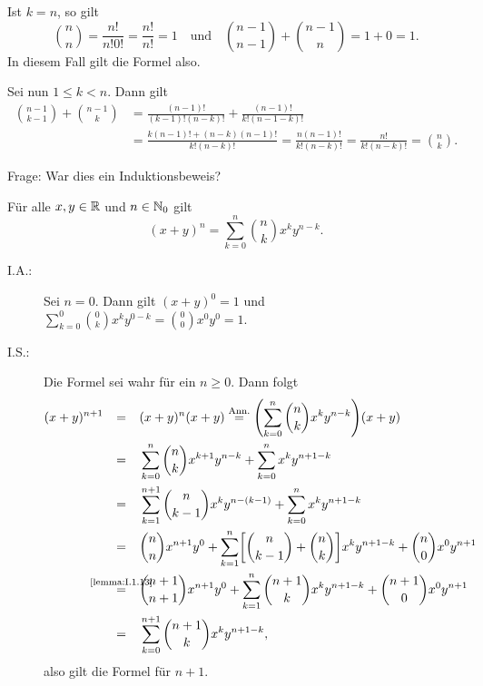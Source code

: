 \begin{beweis}
	Ist $k = n$, so gilt
	\[
		\binom{n}{n} = \frac{n!}{n! 0!} = \frac{n!}{n!} = 1 \quad \text{und} \quad \binom{n-1}{n-1} + \binom{n-1}{n} = 1 + 0 = 1.
	\]
	In diesem Fall gilt die Formel also.
	
	Sei nun $1 \leq k < n$.
	Dann gilt
	\begin{align*}
		\binom{n-1}{k-1} + \binom{n-1}{k} &= \frac{(n-1)!}{(k-1)!(n-k)!} + \frac{(n-1)!}{k!(n-1-k)!} \\
		&= \frac{k(n-1)! + (n-k)(n-1)!}{k!(n-k)!} = \frac{n(n-1)!}{k!(n-k)!} = \frac{n!}{k!(n-k)!} = \binom{n}{k}. 
	\end{align*}
\end{beweis}

Frage: War dies ein Induktionsbeweis?

\begin{satz}
	\label{satz:1.14}
	Für alle $x,y \in \mathbb{R}$ und $n \in \mathbb{N}_0$ gilt
	\[
		(x+y)^n = \sum_{k=0}^{n} \binom{n}{k} x^k y^{n-k}.
	\]
\end{satz}

\begin{beweis}
	\begin{description}
		\item[I.A.:] Sei $n=0$.
		Dann gilt $(x+y)^0 = 1$ und $\sum_{k=0}^{0} \binom{0}{k} x^k y^{0-k} = \binom{0}{0} x^0 y^0 = 1$.
		\item[I.S.:] Die Formel sei wahr für ein $n \geq 0$.
		Dann folgt
		\begin{align*}
			(x+y)^{n+1} &\stack{}{=} (x+y)^n (x+y) \stackrel{\text{Ann.}}{=} \enb{\sum_{k=0}^{n} \binom{n}{k} x^k y^{n-k}}(x+y) \\
			&\stack{}{=} \sum_{k=0}^{n} \binom{n}{k} x^{k+1}y^{n-k} + \sum_{k=0}^{n} x^k y^{n+1-k} \\
			&\stack{}{=} \sum_{k=1}^{n+1} \binom{n}{k-1} x^{k}y^{n-(k-1)} + \sum_{k=0}^{n} x^k y^{n+1-k} \\
			&\stack{}{=} \binom{n}{n} x^{n+1} y^0 + \sum_{k=1}^{n} \benb{\binom{n}{k-1} + \binom{n}{k}} x^k y^{n+1-k} + \binom{n}{0} x^0 y^{n+1} \\
			&\stack{\text{\ref{lemma:I.1.13}}}{=} \binom{n+1}{n+1} x^{n+1} y^0 + \sum_{k=1}^{n} \binom{n+1}{k} x^k y^{n+1-k} + \binom{n+1}{0} x^0 y^{n+1} \\
			&\stack{}{=} \sum_{k=0}^{n+1} \binom{n+1}{k} x^k y^{n+1-k},
		\end{align*}
		also gilt die Formel für $n+1$. 
	\end{description}
	
\end{beweis}

\cleardoubleoddemptypage